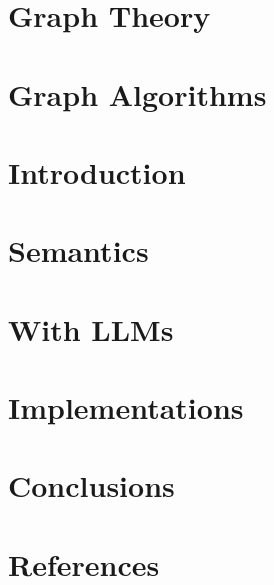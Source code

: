 \section[Theory]{Graph Theory}


\section[Algos]{Graph Algorithms}


\section[Intro]{Introduction}


\section[Sem]{Semantics}


\section[LLMs]{With LLMs}




\section[Impl]{Implementations}


\section[Conclusions]{Conclusions}


\section[Refs]{References}
